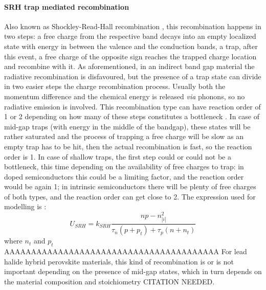 		\paragraph{SRH trap mediated recombination}
		Also known as Shockley-Read-Hall recombination \cite{Shockley1952}, this recombination happens in two steps: a free charge from the respective band decays into an empty localized state with energy in between the valence and the conduction bands, a trap, after this event, a free charge of the opposite sign reaches the trapped charge location and recombine with it.
		As aforementioned, in an indirect band gap material the radiative recombination is disfavoured, but the presence of a trap state can divide in two easier steps the charge recombination process.
		Usually both the momentum difference and the chemical energy is released \textsl{via} phonons, so no radiative emission is involved.
		This recombination type can have reaction order of 1 or 2 depending on how many of these steps constitutes a bottleneck \cite{Calado2018b}.
		In case of mid-gap traps (with energy in the middle of the bandgap), these states will be rather saturated and the process of trapping a free charge will be slow as an empty trap has to be hit, then the actual recombination is fast, so the reaction order is 1.
		In case of shallow traps, the first step could or could not be a bottleneck, this time depending on the availability of free charges to trap: in doped semiconductors this could be a limiting factor, and the reaction order would be again 1; in intrinsic semiconductors there will be plenty of free charges of both types, and the reaction order can get close to 2.
		The expression used for modelling is \cite{Shockley1952}:
		\begin{equation}\label{eq:srh}
		U_{SRH} = k_{SRH} \frac{np-n_|i|^2}{\tau_n(p+p_t)+ \tau_p(n+n_t)}
		\end{equation}
		where $n_t$ and $p_t$ AAAAAAAAAAAAAAAAAAAAAAAAAAAAAAAAAAAAAAAA
		For lead halide hybrid perovskite materials, this kind of recombination is or is not important depending on the presence of mid-gap states, which in turn depends on the material composition and stoichiometry CITATION NEEDED.
		
